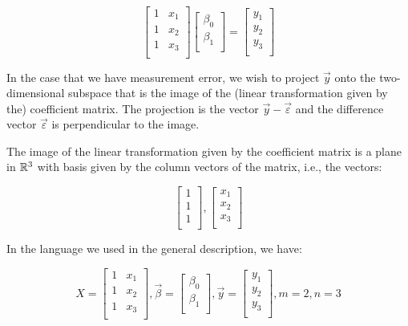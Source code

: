 \documentclass[10pt]{amsart}
\begin{document}
$$\left[\begin{matrix} 1 & x_1 \\ 1 & x_2 \\ 1 & x_3 \\\end{matrix}\right] \left[\begin{matrix} \beta_0 \\ \beta_1 \\\end{matrix}\right] = \left[\begin{matrix} y_1 \\ y_2 \\ y_3 \\\end{matrix}\right]$$

In the case that we have measurement error, we wish to project
$\vec{y}$ onto the two-dimensional subspace that is the image of the
(linear transformation given by the) coefficient matrix. The
projection is the vector $\vec{y} - \vec{\varepsilon}$ and the
difference vector $\vec{\varepsilon}$ is perpendicular to the image.

The image of the linear transformation given by the coefficient
matrix is a plane in $\mathbb{R}^3$ with basis given by the column vectors
of the matrix, i.e., the vectors:

$$\left[\begin{matrix} 1 \\ 1 \\ 1 \\\end{matrix}\right], \left[\begin{matrix} x_1 \\ x_2 \\ x_3 \\\end{matrix}\right]$$

In the language we used in the general description, we have:

$$X = \left[\begin{matrix} 1 & x_1 \\ 1 & x_2 \\ 1 & x_3 \\\end{matrix}\right], \vec{\beta} =  \left[\begin{matrix} \beta_0 \\ \beta_1 \\\end{matrix}\right], \vec{y} = \left[\begin{matrix} y_1 \\ y_2 \\ y_3 \\\end{matrix}\right], m = 2, n = 3$$
\end{document}
